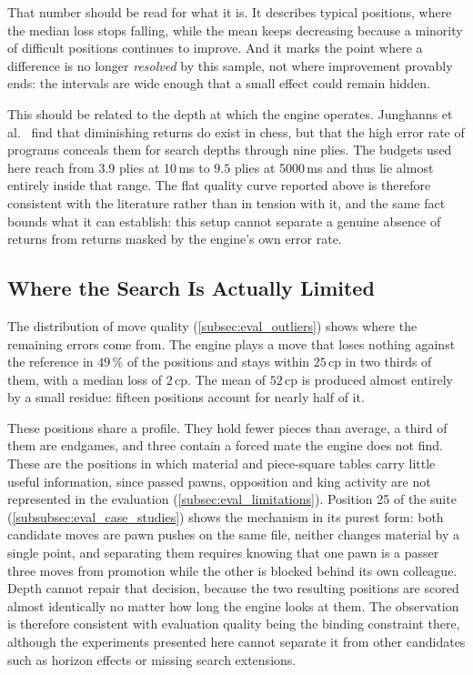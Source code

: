 That number should be read for what it is. It describes typical positions, where
the median loss stops falling, while the mean keeps decreasing because a minority
of difficult positions continues to improve. And it marks the point where a
difference is no longer \emph{resolved} by this sample, not where improvement
provably ends: the intervals are wide enough that a small effect could remain
hidden.

This should be related to the depth at which the engine operates. Junghanns et
al.~\cite{junghanns1997diminishing} find that diminishing returns do exist in
chess, but that the high error rate of programs conceals them for search depths
through nine plies. The budgets used here reach from $3.9$ plies at 10\,ms to
$9.5$ plies at 5000\,ms and thus lie almost entirely inside that range. The flat
quality curve reported above is therefore consistent with the literature rather
than in tension with it, and the same fact bounds what it can establish: this
setup cannot separate a genuine absence of returns from returns masked by the
engine's own error rate.

\subsection{Where the Search Is Actually Limited}
\label{subsec:discussion_limits}

The distribution of move quality (\cref{subsec:eval_outliers}) shows where the
remaining errors come from. The engine plays a move that loses nothing against
the reference in $49\,\%$ of the positions and stays within $25$\,cp in two
thirds of them, with a median loss of $2$\,cp. The mean of $52$\,cp is produced almost entirely by a
small residue: fifteen positions account for nearly half of it.

These positions share a profile. They hold fewer pieces than average, a third of
them are endgames, and three contain a forced mate the engine does not find.
These are the positions in which material and piece-square tables carry little
useful information, since passed pawns, opposition and king activity are not
represented in the evaluation (\cref{subsec:eval_limitations}). Position 25 of
the suite (\cref{subsubsec:eval_case_studies}) shows the mechanism in its purest
form: both candidate moves are pawn pushes on the same file, neither changes
material by a single point, and separating them requires knowing that one pawn is
a passer three moves from promotion while the other is blocked behind its own
colleague. Depth cannot repair that decision, because the two resulting positions
are scored almost identically no matter how long the engine looks at them. The
observation is therefore consistent with evaluation quality being the binding
constraint
there, although the experiments presented here cannot separate it from other
candidates such as horizon effects or missing search extensions.

